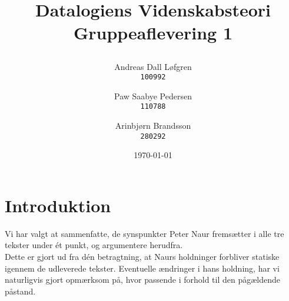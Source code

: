 \documentclass[11pt,a4paper,oneside,final]{article}
\title{ %
    \vspace{2in}
    \LARGE{Datalogiens Videnskabsteori}\\
    \huge{Gruppeaflevering 1}
    \author{ %
        \begin{minipage}{0.30\textwidth}
            \centering
            Andreas Dall Løfgren\\
            \texttt{100992}
        \end{minipage}
        \vspace{5pt}
        \and
        \begin{minipage}{0.30\textwidth}
            \centering
            Paw Saabye Pedersen\\
            \texttt{110788}
        \end{minipage}
        \vspace{5pt}
        \and
        \begin{minipage}{0.35\textwidth}
            \centering
            Arinbjørn Brandsson\\
            \texttt{280292}
        \end{minipage}
    }
    \setcounter{page}{0}
    \date{\today}
}
\begin{document}
\maketitle
\thispagestyle{empty}
\newpage

\thispagestyle{psty:toc}
\tableofcontents
\newpage

\section{Introduktion}
Vi har valgt at sammenfatte, de synspunkter Peter Naur fremsætter i alle tre
tekster under ét punkt, og argumentere herudfra.\\
Dette er gjort ud fra dén betragtning, at Naurs holdninger forbliver statiske
igennem de udleverede tekster. Eventuelle ændringer i hans holdning, har vi
naturligvis gjort opmærksom på, hvor passende i forhold til den pågældende
påstand.




\end{document}
